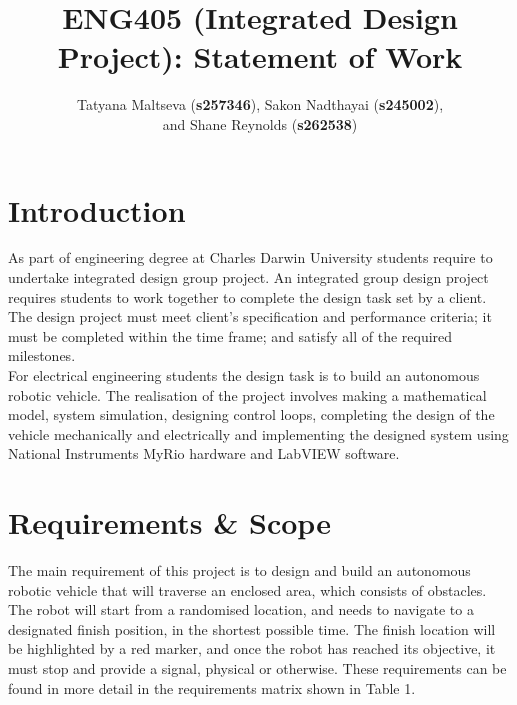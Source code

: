 \documentclass[a4paper]{article}
\begin{document}
\title{ENG405 (Integrated Design Project): Statement of Work}
\author{Tatyana Maltseva (\textbf{s257346}), Sakon Nadthayai (\textbf{s245002}),\\ and Shane Reynolds (\textbf{s262538})}
\maketitle

\tableofcontents

\newpage

\section{Introduction}
As part of engineering degree at Charles Darwin University students require to undertake integrated design group project. An integrated group design project requires students to work together to complete the design task set by a client. The design project must meet client’s specification and performance criteria; it must be completed within the time frame; and satisfy all of the required milestones.\\

For electrical engineering students the design task is to build an autonomous robotic vehicle. The realisation of the project involves making a mathematical model, system simulation, designing control loops, completing the design of the vehicle mechanically and electrically and implementing the designed system using National Instruments MyRio hardware and LabVIEW software. 
\section{Requirements \& Scope}
The main requirement of this project is to design and build an autonomous robotic vehicle that will traverse an enclosed area, which consists of obstacles. The robot will start from a randomised location, and needs to navigate to a designated finish position, in the shortest possible time. The finish location will be highlighted by a red marker, and once the robot has reached its objective, it must stop and provide a signal, physical or otherwise. These requirements can be found in more detail in the requirements matrix shown in Table 1.\\
\end{document}
